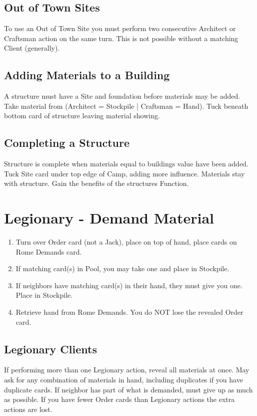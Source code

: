 \documentclass[12pt]{article}
\newenvironment{enumerateCustom}
{\begin{enumerate}
  \setlength{\itemsep}{1pt}
  \setlength{\parskip}{0pt}
  \setlength{\parsep}{0pt}}
{\end{enumerate}}
\begin{document}
\begin{multicols*}{2}
\subsection*{Out of Town Sites}
To use an Out of Town Site you must perform two consecutive Architect or Craftsman action on the same turn. This is not possible without a matching Client (generally).

\subsection*{Adding Materials to a Building}
A structure must have a Site and foundation before materials may be added. Take material from (Architect = Stockpile | Craftsman = Hand). Tuck beneath bottom card of structure leaving material showing.

\subsection*{Completing a Structure}
Structure is complete when materials equal to buildings value have been added. Tuck Site card under top edge of Camp, adding more influence. Materials stay with structure. Gain the benefits of the structures Function.

\section*{Legionary - Demand Material}
\begin{enumerateCustom}
    \item Turn over Order card (not a Jack), place on top of hand, place cards on Rome Demands card.
    \item If matching card(s) in Pool, you may take one and place in Stockpile.
    \item If neighbors have matching card(s) in their hand, they must give you one. Place in Stockpile.
    \item Retrieve hand from Rome Demands. You do NOT lose the revealed Order card.
\end{enumerateCustom}

\subsection*{Legionary Clients}
If performing more than one Legionary action, reveal all materials at once. May ask for any combination of materials in hand, including duplicates if you have duplicate cards. If neighbor has part of what is demanded, must give up as much as possible. If you have fewer Order cards than Legionary actions the extra actions are lost.


\end{multicols*}
\end{document}
